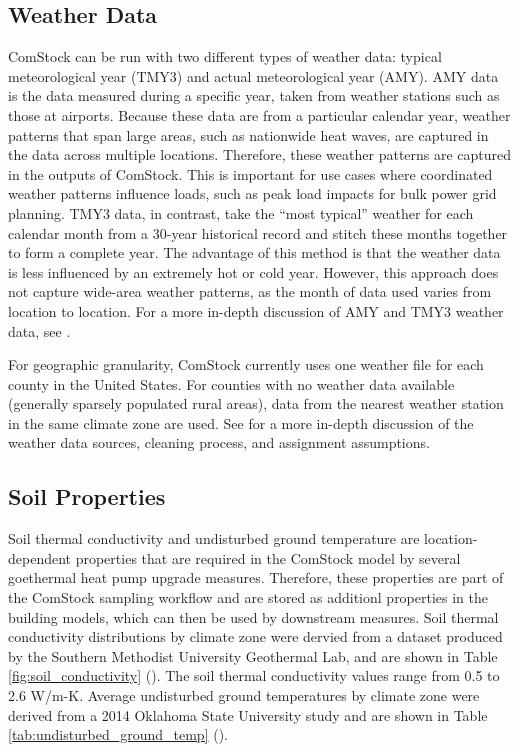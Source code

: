 

\subsection{Weather Data}
ComStock can be run with two different types of weather data: typical meteorological year (TMY3) and actual meteorological year (AMY). AMY data is the data measured during a specific year, taken from weather stations such as those at airports. Because these data are from a particular calendar year, weather patterns that span large areas, such as nationwide heat waves, are captured in the data across multiple locations. Therefore, these weather patterns are captured in the outputs of ComStock. This is important for use cases where coordinated weather patterns influence loads, such as peak load impacts for bulk power grid planning. TMY3 data, in contrast, take the ``most typical'' weather for each calendar month from a 30-year historical record and stitch these months together to form a complete year. The advantage of this method is that the weather data is less influenced by an extremely hot or cold year. However, this approach does not capture wide-area weather patterns, as the month of data used varies from location to location. For a more in-depth discussion of AMY and TMY3 weather data, see \cite{eulp_final_report}.

For geographic granularity, ComStock currently uses one weather file for each county in the United States. For counties with no weather data available (generally sparsely populated rural areas), data from the nearest weather station in the same climate zone are used. See \citep{eulp_final_report} for a more in-depth discussion of the weather data sources, cleaning process, and assignment assumptions.

\subsection{Soil Properties}
Soil thermal conductivity and undisturbed ground temperature are location-dependent properties that are required in the ComStock model by several goethermal heat pump upgrade measures. Therefore, these properties are part of the ComStock sampling workflow and are stored as additionl properties in the building models, which can then be used by downstream measures. Soil thermal conductivity distributions by climate zone were dervied from a dataset produced by the Southern Methodist University Geothermal Lab, and are shown in Table \ref{fig:soil_conductivity} (\cite{smu_soil_conductivity}). The soil thermal conductivity values range from 0.5 to 2.6 W/m-K. Average undisturbed ground temperatures by climate zone were derived from a 2014 Oklahoma State University study and are shown in Table \ref{tab:undisturbed_ground_temp} (\cite{xing2014}).